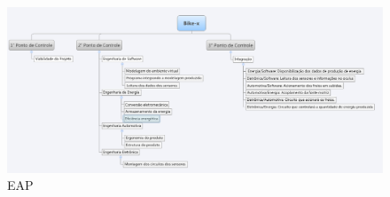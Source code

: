 \begin{figure}[h]
  \centering
  \includegraphics[width=1.2\textwidth, angle =90 ]
      {figuras/bike-x2.eps}
  \caption{EAP}
  \label{EAP}
\end{figure}




  

